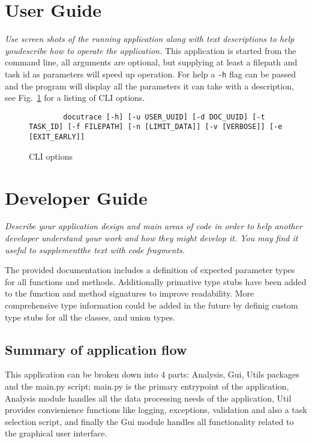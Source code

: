 \documentclass[11pt]{article}
\newcommand{\code}[1]{\colorbox{light-gray}{\texttt{#1}}}
\begin{document}
\section{User Guide}
\emph{Use screen shots of the running application along with text descriptions to help youdescribe how to operate the application.}
This application is started from the command line, all arguments are optional, but supplying at least a filepath and task id as parameters will speed up operation. For help a \code{-h} flag can be passed and the program will display all the parameters it can take with a description, see Fig.~\ref{fig:CLIOpts} for a listing of CLI options.
\begin{figure}[h]
    \begin{verbatim}
        docutrace [-h] [-u USER_UUID] [-d DOC_UUID] [-t TASK_ID] [-f FILEPATH] [-n [LIMIT_DATA]] [-v [VERBOSE]] [-e [EXIT_EARLY]]
    \end{verbatim}
    \caption{CLI options}
    \label{fig:CLIOpts}
\end{figure}



\section{Developer Guide}
\emph{Describe your application design and main areas of code in order to help another developer understand your work and how they might develop it. You may find it useful to supplementthe text with code fragments.}

The provided documentation includes a definition of expected parameter types for all functions and methods. 
Additionally primative type stubs have been added to the function and method signatures to improve readability.
More comprehensive type information could be added in the future by definig custom type stubs for all the classes, and union types.


\subsection{Summary of application flow}
This application can be broken down into 4 parts: Analysis, Gui, Utils packages and the main.py script; 
main.py is the primary entrypoint of the application, Analysis module handles all the data processing needs of the application, Util provides convienience functions like logging, exceptions, validation and also a task selection script, and finally the Gui module handles all functionality related to the graphical user interface. 
\end{document}
